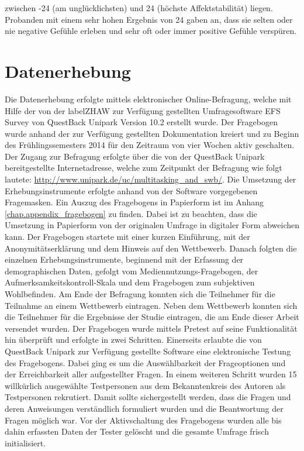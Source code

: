 zwischen -24 (am unglücklichsten) und 24 (höchste Affektstabilität) liegen. Probanden mit einem sehr hohen Ergebnis von 24 gaben an, dass sie selten oder nie negative Gefühle erleben und sehr oft oder immer positive Gefühle verspüren.

\section{Datenerhebung}\label{section.datenerhebung}
Die Datenerhebung erfolgte mittels elektronischer Online-Befragung, welche mit Hilfe der von der \gls{labelZHAW} zur Verfügung gestellten Umfragesoftware EFS Survey von QuestBack Unipark Version 10.2 erstellt wurde. Der Fragebogen wurde anhand der zur Verfügung gestellten Dokumentation kreiert \cite{QuestBack2014} und zu Beginn des Frühlingssemesters 2014 für den Zeitraum von vier Wochen aktiv geschalten. Der Zugang zur Befragung erfolgte über die von der QuestBack Unipark bereitgestellte Internetadresse, welche zum Zeitpunkt der Befragung wie folgt lautete: \url{http://www.unipark.de/uc/multitasking_and_swb/}. Die Umsetzung der Erhebungsinstrumente erfolgte anhand von der Software vorgegebenen Fragemasken. Ein Auszug des Fragebogens in Papierform ist im Anhang \ref{chap.appendix_fragebogen} zu finden. Dabei ist zu beachten, dass die Umsetzung in Papierform von der originalen Umfrage in digitaler Form abweichen kann. Der Fragebogen startete mit einer kurzen Einführung, mit der Anonymitätserklärung und dem Hinweis auf den Wettbewerb. Danach folgten die einzelnen Erhebungsinstrumente, beginnend mit der Erfassung der demographischen Daten, gefolgt vom Mediennutzungs-Fragebogen, der Aufmerksamkeitskontroll-Skala und dem Fragebogen zum subjektiven Wohlbefinden. Am Ende der Befragung konnten sich die Teilnehmer für die Teilnahme an einem Wettbewerb eintragen. Neben dem Wettbewerb konnten sich die Teilnehmer für die Ergebnisse der Studie eintragen, die am Ende dieser Arbeit versendet wurden. Der Fragebogen wurde mittels Pretest auf seine Funktionalität hin überprüft und erfolgte in zwei Schritten. Einerseits erlaubte die von QuestBack Unipark zur Verfügung gestellte Software eine elektronische Testung des Fragebogens. Dabei ging es um die Auswählbarkeit der Frageoptionen und der Erreichbarkeit aller aufgestellter Fragen. In einem weiteren Schritt wurden 15 willkürlich ausgewählte Testpersonen aus dem Bekanntenkreis des Autoren als Testpersonen rekrutiert. Damit sollte sichergestellt werden, dass die Fragen und deren Anweisungen verständlich formuliert wurden und die Beantwortung der Fragen möglich war. Vor der Aktivschaltung des Fragebogens wurden alle bis dahin erfassten Daten der Tester gelöscht und die gesamte Umfrage frisch initialisiert. 


